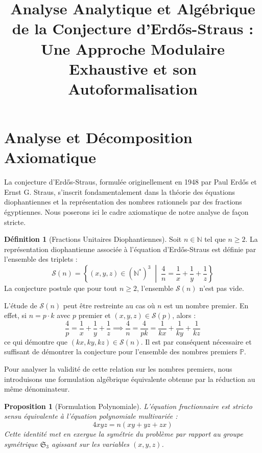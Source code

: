 \documentclass[11pt,a4paper]{article}
\title{Analyse Analytique et Algébrique de la Conjecture d'Erd\H{o}s-Straus : \\ Une Approche Modulaire Exhaustive et son Autoformalisation}
\author{}
\date{}
\newtheorem{proposition}[theorem]{Proposition}
\theoremstyle{definition}
\newtheorem{definition}[theorem]{D\'efinition}
\theoremstyle{remark}
\begin{document}
\maketitle
\tableofcontents
\newpage
\section{Analyse et D\'ecomposition Axiomatique}

La conjecture d'Erd\H{o}s-Straus, formul\'ee originellement en 1948 par Paul Erd\H{o}s et Ernst G. Straus, s'inscrit fondamentalement dans la th\'eorie des \'equations diophantiennes et la repr\'esentation des nombres rationnels par des fractions \'egyptiennes. Nous poserons ici le cadre axiomatique de notre analyse de fa\c{c}on stricte.

\begin{definition}[Fractions Unitaires Diophantiennes]
Soit $n \in \mathbb{N}$ tel que $n \ge 2$. La repr\'esentation diophantienne associ\'ee \`a l'\'equation d'Erd\H{o}s-Straus est d\'efinie par l'ensemble des triplets :
\begin{equation}
\mathcal{S}(n) = \left\{ (x, y, z) \in (\mathbb{N}^*)^3 \;\middle|\; \frac{4}{n} = \frac{1}{x} + \frac{1}{y} + \frac{1}{z} \right\}
\end{equation}
La conjecture postule que pour tout $n \ge 2$, l'ensemble $\mathcal{S}(n)$ n'est pas vide.
\end{definition}

L'\'etude de $\mathcal{S}(n)$ peut \^etre restreinte au cas o\`u $n$ est un nombre premier. En effet, si $n = p \cdot k$ avec $p$ premier et $(x, y, z) \in \mathcal{S}(p)$, alors :
\begin{equation}
\frac{4}{p} = \frac{1}{x} + \frac{1}{y} + \frac{1}{z} \implies \frac{4}{n} = \frac{4}{pk} = \frac{1}{kx} + \frac{1}{ky} + \frac{1}{kz}
\end{equation}
ce qui d\'emontre que $(kx, ky, kz) \in \mathcal{S}(n)$. Il est par cons\'equent n\'ecessaire et suffisant de d\'emontrer la conjecture pour l'ensemble des nombres premiers $\mathbb{P}$.

Pour analyser la validit\'e de cette relation sur les nombres premiers, nous introduisons une formulation alg\'ebrique \'equivalente obtenue par la r\'eduction au m\^eme d\'enominateur.

\begin{proposition}[Formulation Polynomiale]
L'\'equation fractionnaire est stricto sensu \'equivalente \`a l'\'equation polynomiale multivari\'ee :
\begin{equation}
4xyz = n(xy + yz + zx)
\end{equation}
Cette identit\'e met en exergue la sym\'etrie du probl\`eme par rapport au groupe sym\'etrique $\mathfrak{S}_3$ agissant sur les variables $(x, y, z)$.
\end{proposition}
\end{document}
